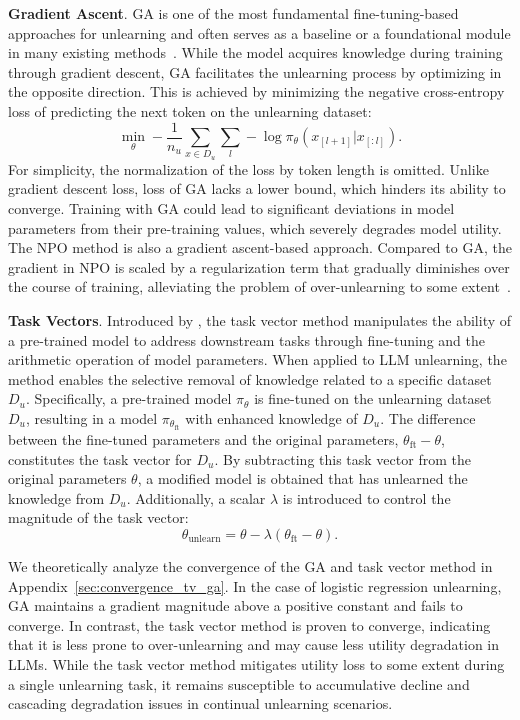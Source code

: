 \documentclass{article}
\theoremstyle{plain}
\theoremstyle{definition}
\theoremstyle{remark}
\begin{document}
\textbf{Gradient Ascent}.
GA is one of the most fundamental fine-tuning-based approaches for unlearning and often serves as a baseline or a foundational module in many existing methods~\cite{DBLP:journals/corr/abs-2310-10683}. 
While the model acquires knowledge during training through gradient descent, GA facilitates the unlearning process by optimizing in the opposite direction. This is achieved by minimizing the negative cross-entropy loss of predicting the next token on the unlearning dataset:
\begin{equation}
	\min_{\theta} -\frac{1}{n_u}\sum_{x\in D_u}\sum_{l}-\log{\pi_{\theta}(x_{[l+1]}|x_{[:l]})}.
\end{equation}
For simplicity, the normalization of the loss by token length is omitted. 
Unlike gradient descent loss, loss of GA lacks a lower bound, which hinders its ability to converge.
Training with GA could lead to significant deviations in model parameters from their pre-training values, which severely degrades model utility.
The NPO method is also a gradient ascent-based approach. Compared to GA, the gradient in NPO is scaled by a regularization term that gradually diminishes over the course of training, alleviating the problem of over-unlearning to some extent~\cite{DBLP:journals/corr/abs-2404-05868}.

\textbf{Task Vectors}. Introduced by \citet{DBLP:conf/iclr/IlharcoRWSHF23}, the task vector method manipulates the ability of a pre-trained model to address downstream tasks through fine-tuning and the arithmetic operation of model parameters.
When applied to LLM unlearning, the method enables the selective removal of knowledge related to a specific dataset $D_u$.
Specifically, a pre-trained model $\pi_{\theta}$ is fine-tuned on the unlearning dataset $D_u$, resulting in a model $\pi_{\theta_{\text{ft}}}$ with enhanced knowledge of $D_u$. The difference between the fine-tuned parameters and the original parameters, $\theta_{\text{ft}}-\theta$, constitutes the task vector for $D_u$.
By subtracting this task vector from the original parameters $\theta$, a modified model is obtained that has unlearned the knowledge from $D_u$.
Additionally, a scalar $\lambda$ is introduced to control the magnitude of the task vector:
\begin{equation}
	\theta_\text{unlearn}=\theta-\lambda(\theta_{\text{ft}}-\theta).
	\label{eq:tv_arithmetic}
\end{equation}

We theoretically analyze the convergence of the GA and task vector method in Appendix~\ref{sec:convergence_tv_ga}.
In the case of logistic regression unlearning, GA  maintains a gradient magnitude above a positive constant and fails to converge. In contrast, the task vector method is proven to converge, indicating that it is less prone to over-unlearning and may cause less utility degradation in LLMs.
While the task vector method mitigates utility loss to some extent during a single unlearning task, it remains susceptible to accumulative decline and cascading degradation issues in continual unlearning scenarios.
\end{document}
